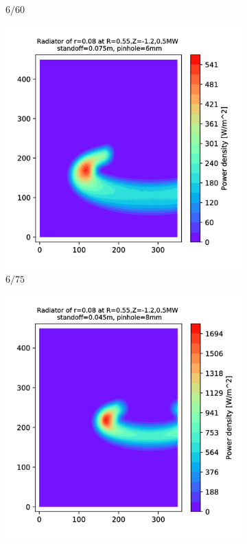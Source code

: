 \begin{figure}
\begin{subfigure}{0.3\textwidth}
         \caption{$6/60$}
         \label{fig:6_60}
     \end{subfigure}
     \hfill
     \begin{subfigure}{0.325\textwidth}
         \centering
         \includegraphics[trim={70 0 0 0},clip,width=\textwidth]{Chapters/chapter2/figs/6_75.png}
         \caption{$6/75$}
         \label{fig:6_75}
     \end{subfigure}
     \begin{subfigure}{0.3\textwidth}
         \centering
         \includegraphics[trim={70 0 110 0},clip,width=\textwidth]{Chapters/chapter2/figs/8_45.png}

\end{subfigure}
\end{figure}
